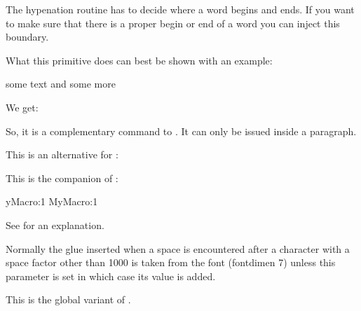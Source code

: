 \stopoldprimitive

\startnewprimitive[title={\prm {wordboundary}}]

The hypenation routine has to decide where a word begins and ends. If you want to
make sure that there is a proper begin or end of a word you can inject this
boundary.

\stopnewprimitive

\startnewprimitive[title={\prm {wrapuppar}}]

What this primitive does can best be shown with an example:

\startbuffer
some text and some more
\stopbuffer

\typebuffer

We get:

\blank \getbuffer \blank

So, it is a complementary command to . It can only be issued
inside a paragraph.

\stopnewprimitive

\startoldprimitive[title={\prm {xdef}}]

This is an alternative for \type {\global \edef}:

\starttyping
\xdef\MyMacro{...}
\stoptyping

\stopoldprimitive

\startnewprimitive[title={\prm {xdefcsname}}]

This is the companion of :

\starttyping
\expandafter\xdef\csname MyMacro:1
             \xdefcsname MyMacro:1
\stoptyping

\stopnewprimitive

\startoldprimitive[title={\prm {xleaders}}]

See  for an explanation.

\stopoldprimitive

\startoldprimitive[title={\prm {xspaceskip}}]

Normally the glue inserted when a space is encountered after a character with a
space factor other than 1000 is taken from the font (fontdimen 7) unless this
parameter is set in which case its value is added.

\stopoldprimitive

\startnewprimitive[title={\prm {xtoks}}]

This is the global variant of .

\stopnewprimitive

